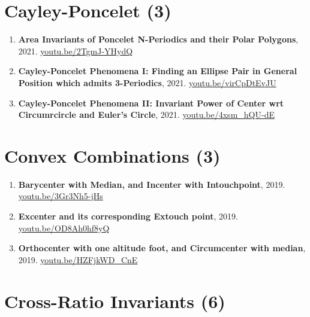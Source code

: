 \documentclass[12pt]{article}
\begin{document}
\section{Cayley-Poncelet (3)}

\begin{enumerate}[resume]
\item \textbf{Area Invariants of Poncelet N-Periodics and their Polar Polygons}, 2021. \href{https://youtu.be/2TgmJ-YHydQ}{\url{youtu.be/2TgmJ-YHydQ}}
\item \textbf{Cayley-Poncelet Phenomena I: Finding an Ellipse Pair in General Position which admits 3-Periodics}, 2021. \href{https://youtu.be/virCpDtEvJU}{\url{youtu.be/virCpDtEvJU}}
\item \textbf{Cayley-Poncelet Phenomena II: Invariant Power of Center wrt Circumrcircle and Euler's Circle}, 2021. \href{https://youtu.be/4xsm_hQU-dE}{\url{youtu.be/4xsm\_hQU-dE}}
\end{enumerate}

\section{Convex Combinations (3)}

\begin{enumerate}[resume]
\item \textbf{Barycenter with Median, and Incenter with Intouchpoint}, 2019. \href{https://youtu.be/3Gr3Nh5-jHs}{\url{youtu.be/3Gr3Nh5-jHs}}
\item \textbf{Excenter and its corresponding Extouch point}, 2019. \href{https://youtu.be/OD8Ah0hf8yQ}{\url{youtu.be/OD8Ah0hf8yQ}}
\item \textbf{Orthocenter with one altitude foot, and Circumcenter with median}, 2019. \href{https://youtu.be/HZFjkWD_CnE}{\url{youtu.be/HZFjkWD\_CnE}}
\end{enumerate}

\section{Cross-Ratio Invariants (6)}
\end{document}
